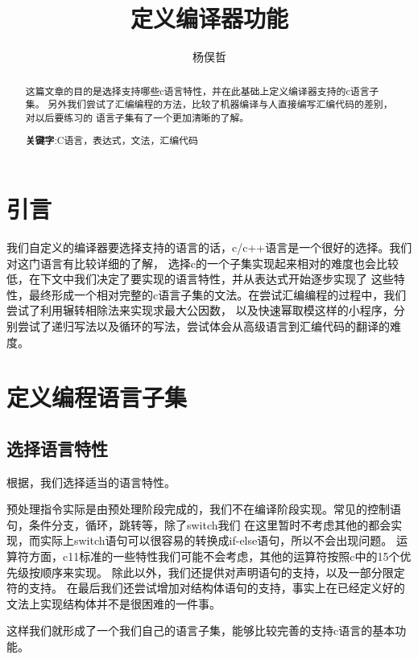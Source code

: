 \documentclass[UTF8]{ctexart}
\begin{document}
\title{定义编译器功能}
\author{杨俣哲}
\maketitle
\begin{abstract}
	这篇文章的目的是选择支持哪些c语言特性，并在此基础上定义编译器支持的c语言子集。
	另外我们尝试了汇编编程的方法，比较了机器编译与人直接编写汇编代码的差别，对以后要练习的
	语言子集有了一个更加清晰的了解。

    \centering
    \textbf{关键字}:C语言，表达式，文法，汇编代码
\end{abstract}
\newpage
\tableofcontents
\newpage
\section{引言}
我们自定义的编译器要选择支持的语言的话，c/c++语言是一个很好的选择。我们对这门语言有比较详细的了解，
选择c的一个子集实现起来相对的难度也会比较低，在下文中我们决定了要实现的语言特性，并从表达式开始逐步实现了
这些特性，最终形成一个相对完整的c语言子集的文法。在尝试汇编编程的过程中，我们尝试了利用辗转相除法来实现求最大公因数，
以及快速幂取模这样的小程序，分别尝试了递归写法以及循环的写法，尝试体会从高级语言到汇编代码的翻译的难度。
\section{定义编程语言子集}
\subsection{选择语言特性}
根据\cite{creference}，我们选择适当的语言特性。

预处理指令实际是由预处理阶段完成的，我们不在编译阶段实现。常见的控制语句，条件分支，循环，跳转等，除了switch我们
在这里暂时不考虑其他的都会实现，而实际上switch语句可以很容易的转换成if-else语句，所以不会出现问题。
运算符方面，c11标准的一些特性我们可能不会考虑，其他的运算符按照c中的15个优先级按顺序来实现。
除此以外，我们还提供对声明语句的支持，以及一部分限定符的支持。
在最后我们还尝试增加对结构体语句的支持，事实上在已经定义好的文法上实现结构体并不是很困难的一件事。

这样我们就形成了一个我们自己的语言子集，能够比较完善的支持c语言的基本功能。
\end{document}
